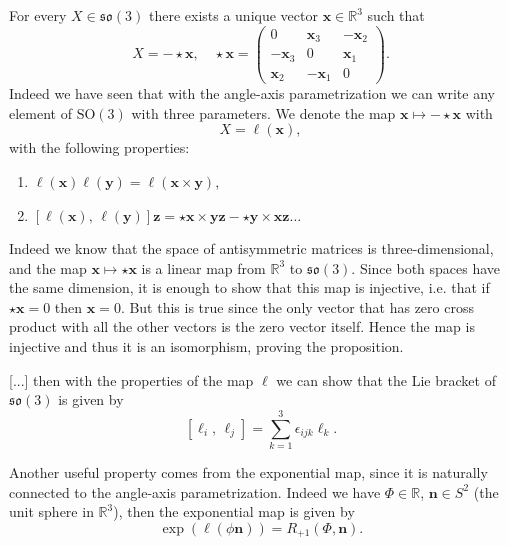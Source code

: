 \begin{proposition}
    For every \(X \in \mathfrak{so}(3)\) there exists a unique vector \(\mathbf{x} \in \mathbb{R}^3\) such that
    \[
        X = - \star \mathbf{x}, \quad \star \mathbf{x} = \begin{pmatrix}
            0             & \mathbf{x}_3  & -\mathbf{x}_2 \\
            -\mathbf{x}_3 & 0             & \mathbf{x}_1  \\
            \mathbf{x}_2  & -\mathbf{x}_1 & 0
        \end{pmatrix}.
    \]
    Indeed we have seen that with the angle-axis parametrization we can write any element of \(\mathrm{SO}(3)\) with three parameters. We denote the map \(\mathbf{x} \mapsto -\star \mathbf{x}\) with
    \[
        X = \ell(\mathbf{x}),
    \]
    with the following properties:
    \begin{enumerate}
        \item \(\ell(\mathbf{x}) \ell(\mathbf{y}) = \ell(\mathbf{x} \times \mathbf{y})\),
        \item \([\ell(\mathbf{x}),\,\ell(\mathbf{y})] \mathbf{z} = \star \mathbf{x} \times \mathbf{y} \mathbf{z} - \star \mathbf{y} \times \mathbf{x} \mathbf{z}\dots  \)
    \end{enumerate}
\end{proposition}

Indeed we know that the space of antisymmetric matrices is three-dimensional, and the map \(\mathbf{x} \mapsto \star \mathbf{x}\) is a linear map from \(\mathbb{R}^3\) to \(\mathfrak{so}(3)\). Since both spaces have the same dimension, it is enough to show that this map is injective, i.e. that if \(\star \mathbf{x} = 0\) then \(\mathbf{x} = 0\). But this is true since the only vector that has zero cross product with all the other vectors is the zero vector itself. Hence the map is injective and thus it is an isomorphism, proving the proposition.

    [...]
then with the properties of the map \(\ell\) we can show that the Lie bracket of \(\mathfrak{so}(3)\) is given by
\[
    \left[\ell_i,\,\ell_j\right] = \sum_{k=1}^3 \epsilon_{ijk} \ell_k.
\]

Another useful property comes from the exponential map, since it is naturally connected to the angle-axis parametrization. Indeed we have \(\Phi \in \mathbb{R}\), \(\mathbf{n} \in S^2\) (the unit sphere in \(\mathbb{R}^3\)), then the exponential map is given by
\[
    \exp(\ell(\phi\mathbf{n})) = R_{+1}(\Phi, \mathbf{n}).
\]

